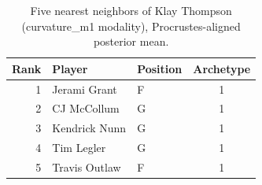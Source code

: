 \begin{table}[htbp]
  \centering\small
  \begin{tabular}{rllc}
    \toprule
    Rank & Player & Position & Archetype \\
    \midrule
    1 & Jerami Grant & F & 1 \\
    2 & CJ McCollum & G & 1 \\
    3 & Kendrick Nunn & G & 1 \\
    4 & Tim Legler & G & 1 \\
    5 & Travis Outlaw & F & 1 \\
    \bottomrule
  \end{tabular}
  \caption{Five nearest neighbors of Klay Thompson (curvature_m1 modality), Procrustes-aligned posterior mean.}
  \label{tab:Klay_Thompson_neighbors_curvature_m1}
\end{table}

